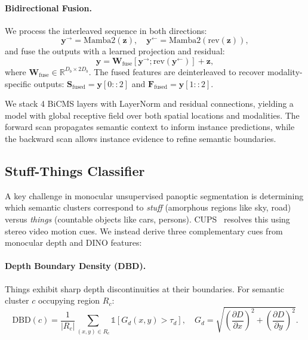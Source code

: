 \documentclass{article}
\begin{document}
\paragraph{Bidirectional Fusion.}
We process the interleaved sequence in both directions:
\begin{equation}
\mathbf{y}^{\rightarrow} = \text{Mamba2}(\mathbf{z}), \quad
\mathbf{y}^{\leftarrow} = \text{Mamba2}(\text{rev}(\mathbf{z})),
\label{eq:bidirectional}
\end{equation}
and fuse the outputs with a learned projection and residual:
\begin{equation}
\mathbf{y} = \mathbf{W}_{\text{fuse}}[\mathbf{y}^{\rightarrow}; \text{rev}(\mathbf{y}^{\leftarrow})] + \mathbf{z},
\label{eq:fusion}
\end{equation}
where $\mathbf{W}_{\text{fuse}} \in \mathbb{R}^{D_b \times 2D_b}$. The fused features are deinterleaved to recover modality-specific outputs: $\mathbf{S}_{\text{fused}} = \mathbf{y}[0\!:\!:2]$ and $\mathbf{F}_{\text{fused}} = \mathbf{y}[1\!:\!:2]$.

We stack 4 BiCMS layers with LayerNorm and residual connections, yielding a model with global receptive field over both spatial locations and modalities. The forward scan propagates semantic context to inform instance predictions, while the backward scan allows instance evidence to refine semantic boundaries.


\subsection{Stuff-Things Classifier}
\label{sec:stuff_things}

A key challenge in monocular unsupervised panoptic segmentation is determining which semantic clusters correspond to \emph{stuff} (amorphous regions like sky, road) versus \emph{things} (countable objects like cars, persons). CUPS~\cite{hahn2025cups} resolves this using stereo video motion cues. We instead derive three complementary cues from monocular depth and DINO features:

\paragraph{Depth Boundary Density (DBD).}
Things exhibit sharp depth discontinuities at their boundaries. For semantic cluster $c$ occupying region $R_c$:
\begin{equation}
\text{DBD}(c) = \frac{1}{|R_c|} \sum_{(x,y) \in R_c} \mathbb{1}\!\left[G_d(x,y) > \tau_d\right], \quad
G_d = \sqrt{\left(\frac{\partial D}{\partial x}\right)^2 + \left(\frac{\partial D}{\partial y}\right)^2}.
\label{eq:dbd}
\end{equation}
\end{document}
